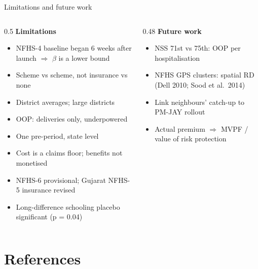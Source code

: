 \documentclass[compress]{beamer}
\begin{document}
\begin{frame}[t]{Limitations and future work}
\footnotesize
\begin{columns}[T]
\begin{column}{0.5\textwidth}
\textbf{Limitations}
\begin{itemize}
\item NFHS-4 baseline began 6 weeks after launch $\Rightarrow$ $\beta$ is a lower bound
\item Scheme vs scheme, not insurance vs none
\item District averages; large districts
\item OOP: deliveries only, underpowered
\item One pre-period, state level
\item Cost is a claims floor; benefits not monetised
\item NFHS-6 provisional; Gujarat NFHS-5 insurance revised
\item Long-difference schooling placebo significant (p = 0.04)
\end{itemize}
\end{column}
\begin{column}{0.48\textwidth}
\textbf{Future work}
\begin{itemize}
\item NSS 71st vs 75th: OOP per hospitalisation
\item NFHS GPS clusters: spatial RD (Dell 2010; Sood et al.\ 2014)
\item Link neighbours' catch-up to PM-JAY rollout
\item Actual premium $\Rightarrow$ MVPF / value of risk protection
\end{itemize}
\end{column}
\end{columns}
\end{frame}

\section*{References}
\end{document}
